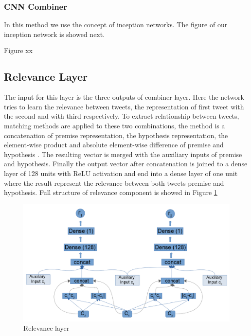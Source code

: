 \documentclass[12pt]{report}
\begin{document}
  
\subsubsection{\ac{CNN} Combiner}

In this method we use the concept of inception networks. The figure of our inception network is showed next.

Figure xx


\subsection{Relevance Layer}

The input for this layer is the three outputs of combiner layer. Here the network tries to learn the relevance between tweets, the representation of first tweet with the second and with third respectively. To extract relationship between tweets, matching methods are applied to these two combinations, the method is a concatenation of premise representation, the hypothesis representation, the element-wise product and absolute element-wise difference of premise and hypothesis \cite{Conneau2017}. The resulting vector is merged with the auxiliary inputs of premise and hypothesis. Finally the output vector after concatenation is joined to a dense layer of 128 units with {ReLU} activation and end into a dense layer of one unit where the result represent the relevance between both tweets premise and hypothesis. Full structure of relevance component is showed in Figure \ref{figure:relevance}

\begin{figure}[H]	
	\centering
	\includegraphics[width=150mm, scale = 1]{images/14_relevance.png}	
	\caption{Relevance layer}	
	\label{figure:relevance}
\end{figure}
\end{document}
